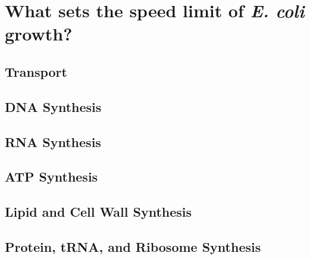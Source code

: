 \section{What sets the speed limit of \textit{E. coli} growth?}


\begin{figure}
\end{figure}


\subsection{Transport}

\begin{figure}
\end{figure}

\subsection{DNA Synthesis}

\subsection{RNA Synthesis}

\subsection{ATP Synthesis}

\subsection{Lipid and Cell Wall Synthesis}

\subsection{Protein, tRNA, and Ribosome Synthesis}